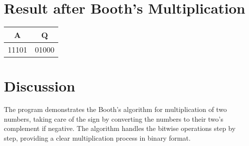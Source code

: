 \documentclass[a4paper,12pt]{article}
\begin{document}
\section*{Result after Booth's Multiplication}
\begin{tabular}{cc}
\textbf{A} & \textbf{Q} \\
\hline
11101 & 01000 \\
\end{tabular}

\section*{Discussion}
The program demonstrates the Booth's algorithm for multiplication of two numbers, taking care of the sign by converting the numbers to their two's complement if negative. The algorithm handles the bitwise operations step by step, providing a clear multiplication process in binary format.
\end{document}
